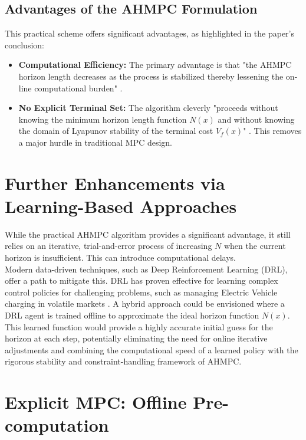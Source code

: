 \subsection{Advantages of the AHMPC Formulation}
This practical scheme offers significant advantages, as highlighted in the paper's conclusion:
\begin{itemize}
    \item \textbf{Computational Efficiency:} The primary advantage is that "the AHMPC horizon length decreases as the process is stabilized thereby lessening the on-line computational burden" \cite{krener2016adaptive}.
    \item \textbf{No Explicit Terminal Set:} The algorithm cleverly "proceeds without knowing the minimum horizon length function $N(x)$ and without knowing the domain of Lyapunov stability of the terminal cost $V_f(x)$" \cite{krener2016adaptive}. This removes a major hurdle in traditional MPC design.
\end{itemize}

\section{Further Enhancements via Learning-Based Approaches}

While the practical AHMPC algorithm provides a significant advantage, it still relies on an iterative, trial-and-error process of increasing $N$ when the current horizon is insufficient. This can introduce computational delays.
\\
\noindent
Modern data-driven techniques, such as Deep Reinforcement Learning (DRL), offer a path to mitigate this. DRL has proven effective for learning complex control policies for challenging problems, such as managing Electric Vehicle charging in volatile markets \cite{orfanoudakis2022deep}. A hybrid approach could be envisioned where a DRL agent is trained offline to approximate the ideal horizon function $N(x)$. This learned function would provide a highly accurate initial guess for the horizon at each step, potentially eliminating the need for online iterative adjustments and combining the computational speed of a learned policy with the rigorous stability and constraint-handling framework of AHMPC.




\section{Explicit MPC: Offline Pre-computation}

